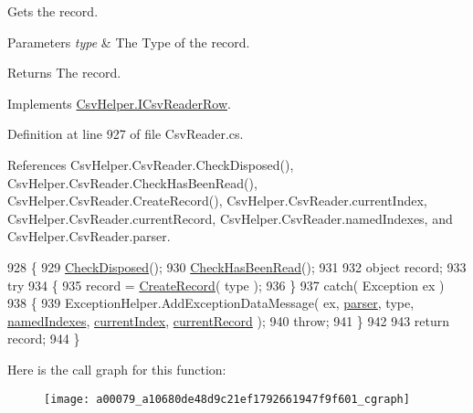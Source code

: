 Gets the record. 


\begin{DoxyParams}{Parameters}
{\em type} & The Type of the record.\\
\hline
\end{DoxyParams}
\begin{DoxyReturn}{Returns}
The record.
\end{DoxyReturn}


Implements \hyperlink{a00117_a911748932ed897a2e7086c0c49bdceea}{Csv\-Helper.\-I\-Csv\-Reader\-Row}.



Definition at line 927 of file Csv\-Reader.\-cs.



References Csv\-Helper.\-Csv\-Reader.\-Check\-Disposed(), Csv\-Helper.\-Csv\-Reader.\-Check\-Has\-Been\-Read(), Csv\-Helper.\-Csv\-Reader.\-Create\-Record(), Csv\-Helper.\-Csv\-Reader.\-current\-Index, Csv\-Helper.\-Csv\-Reader.\-current\-Record, Csv\-Helper.\-Csv\-Reader.\-named\-Indexes, and Csv\-Helper.\-Csv\-Reader.\-parser.


\begin{DoxyCode}
928         \{
929             \hyperlink{a00079_a6fa45a46ed1322dc1872ca2321b5edbc}{CheckDisposed}();
930             \hyperlink{a00079_a2d9249171ed1568e45d152766d364c31}{CheckHasBeenRead}();
931 
932             \textcolor{keywordtype}{object} record;
933             \textcolor{keywordflow}{try}
934             \{
935                 record = \hyperlink{a00079_a722545ede4e575795ee9a73f6ada0ac7}{CreateRecord}( type );
936             \}
937             \textcolor{keywordflow}{catch}( Exception ex )
938             \{
939                 ExceptionHelper.AddExceptionDataMessage( ex, \hyperlink{a00079_aaf2ee64c7a157027aea69bfae1fa9edc}{parser}, type, 
      \hyperlink{a00079_a3114f49bd2b3c4966f4b15a310747aeb}{namedIndexes}, \hyperlink{a00079_a56e974bc7e2242912e956393e831e166}{currentIndex}, \hyperlink{a00079_ab2bfef15784add66e441c9d3a0d73751}{currentRecord} );
940                 \textcolor{keywordflow}{throw};
941             \}
942 
943             \textcolor{keywordflow}{return} record;
944         \}
\end{DoxyCode}


Here is the call graph for this function\-:
\nopagebreak
\begin{figure}[H]
\begin{center}
\leavevmode
\texttt{[image: a00079\_a10680de48d9c21ef1792661947f9f601\_cgraph]}
\end{center}
\end{figure}


